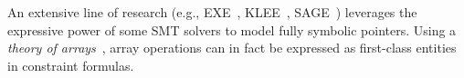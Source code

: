 \begin{itemize}

\end{itemize}


\noindent An extensive line of research (e.g., {\sc EXE}~\cite{EXE-CCS06}, {\sc KLEE}~\cite{KLEE-OSDI08}, {\sc SAGE}~\cite{EGL-ISSTA09}) leverages the expressive power of some SMT solvers to model fully symbolic pointers. Using a {\em theory of arrays}~\cite{STP-CAV07}, array operations can in fact be expressed as first-class entities in constraint formulas.

